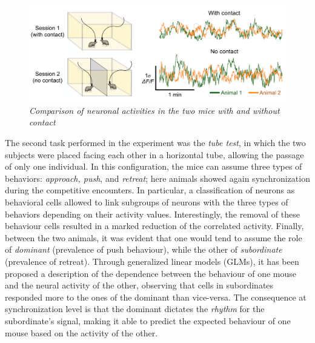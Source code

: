 \documentclass[12pt, a4paper]{report}
\begin{document}
\begin{figure}[H]
	\begin{center}
		\includegraphics[scale=.45]{kingsbury.png} 
	\end{center} 
	\caption{\textit{Comparison of neuronal activities in the two mice with and without contact}} \label{kingsbury}
	
\end{figure}


The second task performed in the experiment was the \textit{tube test}, in which the two subjects were placed facing each other in a horizontal tube, allowing the passage of only one individual. In this configuration, the mice can assume three types of behaviors: \textit{approach, push}, and \textit{retreat}; here animals showed again synchronization during the competitive encounters. In particular, a classification of neurons as behavioral cells allowed to link subgroups of neurons with the three types of behaviors depending on their activity values. Interestingly, the removal of these behaviour cells resulted in a marked reduction of the correlated activity. Finally, between the two animals, it was evident that one would tend to assume the role of \textit{dominant} (prevalence of push behaviour), while the other of \textit{subordinate} (prevalence of retreat). Through generalized linear models (GLMs), it has been proposed a description of the dependence between the behaviour of one mouse and the neural activity of the other, observing that cells in subordinates responded more to the ones of the dominant than vice-versa. The consequence at synchronization level is that the dominant dictates the \textit{rhythm} for the subordinate's signal, making it able to predict the expected behaviour of one mouse based on the activity of the other.
\end{document}
